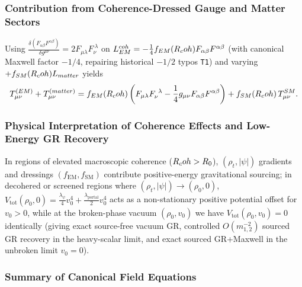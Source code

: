 \subsubsection{Contribution from Coherence-Dressed Gauge and Matter Sectors}

Using $\frac{\delta(F_{\alpha\beta}F^{\alpha\beta})}{\delta g^{\mu\nu}} = 2 F_{\mu\lambda}F_\nu^{\ \lambda}$ on $L_{EM}^{coh} = -\frac{1}{4}f_{EM}(R_coh)F_{\alpha\beta}F^{\alpha\beta}$ (with canonical Maxwell factor $-1/4$, repairing historical $-1/2$ typos \texttt{T1}) and varying $+f_{SM}(R_coh)L_{matter}$ yields
\begin{equation}
T_{\mu\nu}^{(EM)} + T_{\mu\nu}^{(matter)}
= f_{EM}(R_coh)\left(F_{\mu\lambda}F_\nu^{\ \lambda} - \frac{1}{4}g_{\mu\nu}F_{\alpha\beta}F^{\alpha\beta}\right)
  + f_{SM}(R_coh)\,T_{\mu\nu}^{SM}.
\label{eq:T_dressed_combined_sec8}
\end{equation}

\subsubsection{Physical Interpretation of Coherence Effects and Low-Energy GR Recovery}

In regions of elevated macroscopic coherence ($R_coh > R_0$), $(\rho_t, |\psi|)$ gradients and dressings $(f_{\mathrm{EM}}, f_{\mathrm{SM}})$ contribute positive-energy gravitational sourcing; in decohered or screened regions where $(\rho_t, |\psi|) \to (\rho_0, 0)$, $V_{\mathrm{tot}}(\rho_0, 0) = \frac{\lambda_\psi}{4}v_0^4 + \frac{\lambda_{\mathrm{portal}}}{2}v_0^4$ acts as a non-stationary positive potential offset for $v_0 > 0$, while at the broken-phase vacuum $(\rho_0, v_0)$ we have $V_{\mathrm{tot}}(\rho_0, v_0) = 0$ identically (giving exact source-free vacuum GR, controlled $O(m_{1,2}^{-2})$ sourced GR recovery in the heavy-scalar limit, and exact sourced GR+Maxwell in the unbroken limit $v_0 = 0$).

\subsubsection{Summary of Canonical Field Equations}

